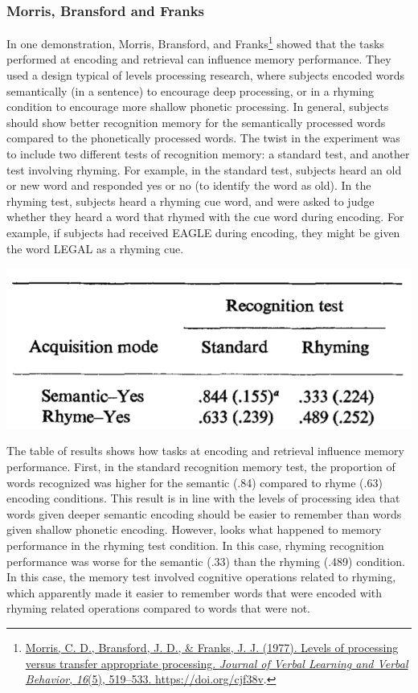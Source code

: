 \documentclass[
  oneside,
  12pt]{crumpbook}
\newenvironment{floatright50}{%
  \wrapfigure{R}{.5\textwidth}%
  }{%
  \endwrapfigure}
\begin{document}
\hypertarget{morris-bransford-and-franks}{%
\subsubsection{Morris, Bransford and Franks}\label{morris-bransford-and-franks}}

In one demonstration, Morris, Bransford, and Franks\footnote{\protect\hyperlink{ref-morrisLevelsProcessingTransfer1977}{Morris, C. D., Bransford, J. D., \& Franks, J. J. (1977). Levels of processing versus transfer appropriate processing. \emph{Journal of Verbal Learning and Verbal Behavior}, \emph{16}(5), 519--533. \url{https://doi.org/cjf38v}}.} showed that the tasks performed at encoding and retrieval can influence memory performance. They used a design typical of levels processing research, where subjects encoded words semantically (in a sentence) to encourage deep processing, or in a rhyming condition to encourage more shallow phonetic processing. In general, subjects should show better recognition memory for the semantically processed words compared to the phonetically processed words. The twist in the experiment was to include two different tests of recognition memory: a standard test, and another test involving rhyming. For example, in the standard test, subjects heard an old or new word and responded yes or no (to identify the word as old). In the rhyming test, subjects heard a rhyming cue word, and were asked to judge whether they heard a word that rhymed with the cue word during encoding. For example, if subjects had received EAGLE during encoding, they might be given the word LEGAL as a rhyming cue.

\begin{floatright50}
\includegraphics[width=1\linewidth]{imgs/Tip_Tap}

\end{floatright50}

The table of results shows how tasks at encoding and retrieval influence memory performance. First, in the standard recognition memory test, the proportion of words recognized was higher for the semantic (.84) compared to rhyme (.63) encoding conditions. This result is in line with the levels of processing idea that words given deeper semantic encoding should be easier to remember than words given shallow phonetic encoding. However, looks what happened to memory performance in the rhyming test condition. In this case, rhyming recognition performance was worse for the semantic (.33) than the rhyming (.489) condition. In this case, the memory test involved cognitive operations related to rhyming, which apparently made it easier to remember words that were encoded with rhyming related operations compared to words that were not.
\end{document}
